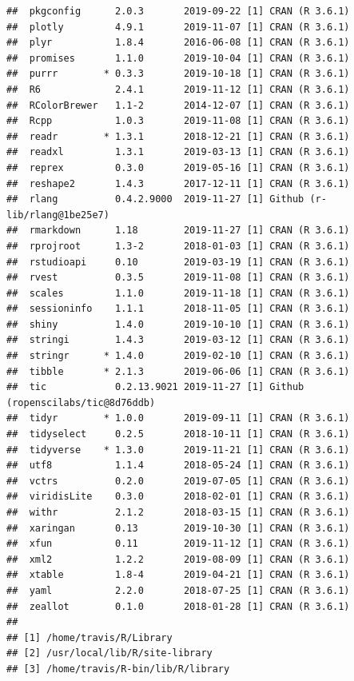 \documentclass[]{book}
\begin{document}
\begin{verbatim}
##  pkgconfig      2.0.3       2019-09-22 [1] CRAN (R 3.6.1)                   
##  plotly         4.9.1       2019-11-07 [1] CRAN (R 3.6.1)                   
##  plyr           1.8.4       2016-06-08 [1] CRAN (R 3.6.1)                   
##  promises       1.1.0       2019-10-04 [1] CRAN (R 3.6.1)                   
##  purrr        * 0.3.3       2019-10-18 [1] CRAN (R 3.6.1)                   
##  R6             2.4.1       2019-11-12 [1] CRAN (R 3.6.1)                   
##  RColorBrewer   1.1-2       2014-12-07 [1] CRAN (R 3.6.1)                   
##  Rcpp           1.0.3       2019-11-08 [1] CRAN (R 3.6.1)                   
##  readr        * 1.3.1       2018-12-21 [1] CRAN (R 3.6.1)                   
##  readxl         1.3.1       2019-03-13 [1] CRAN (R 3.6.1)                   
##  reprex         0.3.0       2019-05-16 [1] CRAN (R 3.6.1)                   
##  reshape2       1.4.3       2017-12-11 [1] CRAN (R 3.6.1)                   
##  rlang          0.4.2.9000  2019-11-27 [1] Github (r-lib/rlang@1be25e7)     
##  rmarkdown      1.18        2019-11-27 [1] CRAN (R 3.6.1)                   
##  rprojroot      1.3-2       2018-01-03 [1] CRAN (R 3.6.1)                   
##  rstudioapi     0.10        2019-03-19 [1] CRAN (R 3.6.1)                   
##  rvest          0.3.5       2019-11-08 [1] CRAN (R 3.6.1)                   
##  scales         1.1.0       2019-11-18 [1] CRAN (R 3.6.1)                   
##  sessioninfo    1.1.1       2018-11-05 [1] CRAN (R 3.6.1)                   
##  shiny          1.4.0       2019-10-10 [1] CRAN (R 3.6.1)                   
##  stringi        1.4.3       2019-03-12 [1] CRAN (R 3.6.1)                   
##  stringr      * 1.4.0       2019-02-10 [1] CRAN (R 3.6.1)                   
##  tibble       * 2.1.3       2019-06-06 [1] CRAN (R 3.6.1)                   
##  tic            0.2.13.9021 2019-11-27 [1] Github (ropenscilabs/tic@8d76ddb)
##  tidyr        * 1.0.0       2019-09-11 [1] CRAN (R 3.6.1)                   
##  tidyselect     0.2.5       2018-10-11 [1] CRAN (R 3.6.1)                   
##  tidyverse    * 1.3.0       2019-11-21 [1] CRAN (R 3.6.1)                   
##  utf8           1.1.4       2018-05-24 [1] CRAN (R 3.6.1)                   
##  vctrs          0.2.0       2019-07-05 [1] CRAN (R 3.6.1)                   
##  viridisLite    0.3.0       2018-02-01 [1] CRAN (R 3.6.1)                   
##  withr          2.1.2       2018-03-15 [1] CRAN (R 3.6.1)                   
##  xaringan       0.13        2019-10-30 [1] CRAN (R 3.6.1)                   
##  xfun           0.11        2019-11-12 [1] CRAN (R 3.6.1)                   
##  xml2           1.2.2       2019-08-09 [1] CRAN (R 3.6.1)                   
##  xtable         1.8-4       2019-04-21 [1] CRAN (R 3.6.1)                   
##  yaml           2.2.0       2018-07-25 [1] CRAN (R 3.6.1)                   
##  zeallot        0.1.0       2018-01-28 [1] CRAN (R 3.6.1)                   
## 
## [1] /home/travis/R/Library
## [2] /usr/local/lib/R/site-library
## [3] /home/travis/R-bin/lib/R/library
\end{verbatim}
\end{document}
